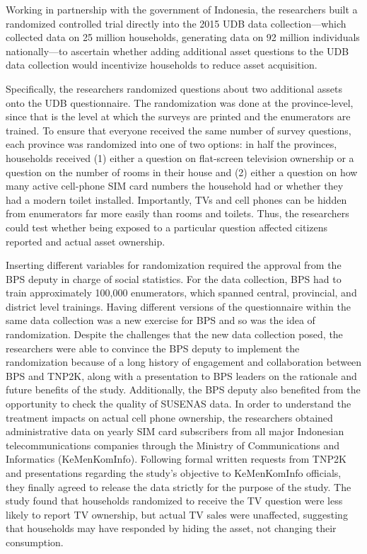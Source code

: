 Working in partnership with the government of Indonesia, the researchers built a randomized controlled trial directly into the 2015 UDB data collection---which collected data on 25 million households, generating data on 92 million individuals nationally---to ascertain whether adding additional asset questions to the UDB data collection would incentivize households to reduce asset acquisition.

Specifically, the researchers randomized questions about two additional assets onto the UDB questionnaire. The randomization was done at the province-level, since that is the level at which the surveys are printed and the enumerators are trained. To ensure that everyone received the same number of survey questions, each province was randomized into one of two options: in half the provinces, households received (1) either a question on flat-screen television ownership or a question on the number of rooms in their house and (2) either a question on how many active cell-phone SIM card numbers the household had or whether they had a modern toilet installed. Importantly, TVs and cell phones can be hidden from enumerators far more easily than rooms and toilets. Thus, the researchers could test whether being exposed to a particular question affected citizens reported and actual asset ownership.

Inserting different variables for randomization required the approval from the BPS deputy in charge of social statistics. For the data collection, BPS had to train approximately 100,000 enumerators, which spanned central, provincial, and district level trainings. Having different versions of the questionnaire within the same data collection was a new exercise for BPS and so was the idea of randomization. Despite the challenges that the new data collection posed, the researchers were able to convince the BPS deputy to implement the randomization because of a long history of engagement and collaboration between BPS and TNP2K, along with a presentation to BPS leaders on the rationale and future benefits of the study. Additionally, the BPS deputy also benefited from the opportunity to check the quality of SUSENAS data. In order to understand the treatment impacts on actual cell phone ownership, the researchers obtained administrative data on yearly SIM card subscribers from all major Indonesian telecommunications companies through the Ministry of Communications and Informatics (KeMenKomInfo). Following formal written requests from TNP2K and presentations regarding the study's objective to KeMenKomInfo officials, they finally agreed to release the data strictly for the purpose of the study. The study found that households randomized to receive the TV question were less likely to report TV ownership, but actual TV sales were unaffected, suggesting that households may have responded by hiding the asset, not changing their consumption.

